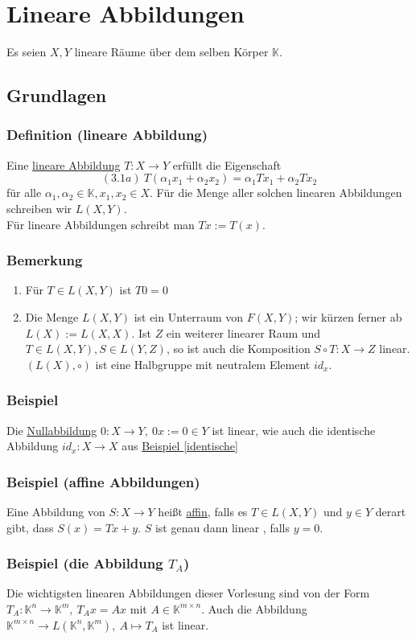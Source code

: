 \section{Lineare Abbildungen}
Es seien $X,Y$ lineare Räume über dem selben Körper $\mathbb{K}$.
\subsection{Grundlagen}
\subsubsection{Definition (lineare Abbildung)}
Eine \underline{lineare Abbildung} $T: X\rightarrow Y$ erfüllt die Eigenschaft
\[(3.1a)\ T(\alpha _1x_1+\alpha _2x_2)=\alpha _1Tx_1+\alpha _2Tx_2\]
für alle $\alpha _1,\alpha _2\in\mathbb{K},x_1,x_2\in X$.  Für die Menge aller solchen linearen Abbildungen schreiben wir $L(X,Y)$.\\
Für lineare Abbildungen schreibt man $Tx:=T(x)$.
\subsubsection{Bemerkung}
\renewcommand{\labelenumi}{(\arabic{enumi})}
\begin{enumerate}
\item Für $T\in L(X,Y)$ ist $T0=0$
\item Die Menge $L(X,Y)$ ist ein Unterraum von $F(X,Y)$; wir kürzen ferner ab $L(X):=L(X,X)$.  Ist $Z$ ein weiterer linearer Raum und $T\in L(X,Y),S\in L(Y,Z)$, so ist auch die Komposition $S\circ T:X\rightarrow Z$ linear. $(L(X),\circ )$ ist eine Halbgruppe mit neutralem Element $id_x$.
\end{enumerate}
\subsubsection{Beispiel}
Die \underline{Nullabbildung} $0:X\rightarrow Y,\ 0x:=0\in Y$ ist linear, wie auch die identische Abbildung $id_x:X\rightarrow X$ aus \hyperref[identische]{Beispiel \ref*{identische}}
\subsubsection{Beispiel (affine Abbildungen)}
Eine Abbildung von $S:X\rightarrow Y$ heißt \underline{affin}, falls es $T\in L(X,Y)$ und $y\in Y$ derart gibt, dass $S(x)=Tx+y$.  $S$ ist genau dann linear , falls $y=0$.
\subsubsection{Beispiel (die Abbildung $T_A$)}
\label{3.1.5}
Die wichtigsten linearen Abbildungen dieser Vorlesung sind von der Form $T_A:\mathbb{K}^n\rightarrow \mathbb{K}^m,\ T_Ax=Ax$ mit $A\in\mathbb{K}^{m\times n}$.  Auch die Abbildung $\mathbb{K}^{m\times n}\rightarrow L(\mathbb{K}^n,\mathbb{K}^m),\ A\mapsto T_A$ ist linear.
